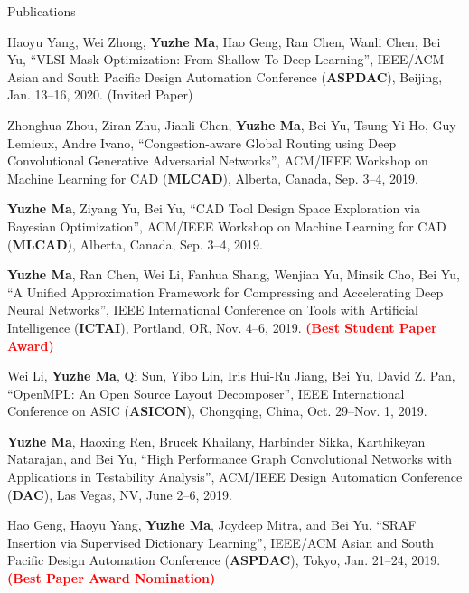 \begin{rSection}{Publications}
\begin{etaremune}
\item{
        Haoyu Yang, Wei Zhong, \textbf{Yuzhe Ma}, Hao Geng, Ran Chen, Wanli Chen, Bei Yu,
        ``VLSI Mask Optimization: From Shallow To Deep Learning'',
        IEEE/ACM Asian and South Pacific Design Automation Conference (\textbf{ASPDAC}), Beijing, Jan. 13--16, 2020. (Invited Paper)
}

\item{
        Zhonghua Zhou, Ziran Zhu, Jianli Chen, \textbf{Yuzhe Ma}, Bei Yu, Tsung-Yi Ho, Guy Lemieux, Andre Ivano,
        ``Congestion-aware Global Routing using Deep Convolutional Generative Adversarial Networks'',
        ACM/IEEE Workshop on Machine Learning for CAD (\textbf{MLCAD}), Alberta, Canada, Sep. 3--4, 2019.
}

\item{
        \textbf{Yuzhe Ma}, Ziyang Yu, Bei Yu,
        ``CAD Tool Design Space Exploration via Bayesian Optimization'',
        ACM/IEEE Workshop on Machine Learning for CAD (\textbf{MLCAD}), Alberta, Canada, Sep. 3--4, 2019.
}

\item{
   \textbf{Yuzhe Ma}, Ran Chen, Wei Li, Fanhua Shang, Wenjian Yu, Minsik Cho, Bei Yu,
        ``A Unified Approximation Framework for Compressing and Accelerating Deep Neural Networks'',
        IEEE International Conference on Tools with Artificial Intelligence (\textbf{ICTAI}), Portland, OR, Nov. 4--6, 2019.
        \textcolor{red}{\textbf{(Best Student Paper Award)}}
}

\item{
        Wei Li, \textbf{Yuzhe Ma}, Qi Sun, Yibo Lin, Iris Hui-Ru Jiang, Bei Yu, David Z. Pan,
        ``OpenMPL: An Open Source Layout Decomposer'',
        IEEE International Conference on ASIC (\textbf{ASICON}), Chongqing, China, Oct. 29--Nov. 1, 2019.
}

\item{
	\textbf{Yuzhe Ma}, Haoxing Ren, Brucek Khailany, Harbinder Sikka, Karthikeyan Natarajan, and Bei Yu,
     ``High Performance Graph Convolutional Networks with Applications in Testability Analysis'',
     ACM/IEEE Design Automation Conference (\textbf{DAC}), Las Vegas, NV, June 2--6, 2019.
}

\item{
	Hao Geng, Haoyu Yang, \textbf{Yuzhe Ma}, Joydeep Mitra, and Bei Yu,
	``SRAF Insertion via Supervised Dictionary Learning'',
	IEEE/ACM Asian and South Pacific Design Automation Conference (\textbf{ASPDAC}), Tokyo, Jan. 21--24, 2019. \textbf{\textcolor{red}{(Best Paper Award Nomination)}}
}


\end{etaremune}
\end{rSection}
